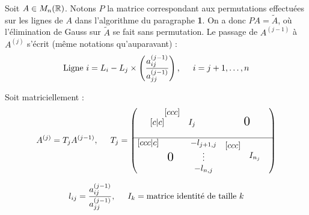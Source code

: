 Soit $A \in M_n(\mathbb{R})$. Notons $P$ la matrice correspondant aux permutations effectuées sur les lignes de $A$ dans l'algorithme du paragraphe \textbf{1}.
On a donc $PA = \tilde{A}$, où l'élimination de Gauss sur $\tilde{A}$ se fait sans permutation. Le passage de $A^{(j-1)}$ à $A^{(j)}$ s'écrit (même notations qu'auparavant) : 
\[
    \text{Ligne $i$} = L_i - L_j \times \left( \frac{a^{(j-1)}_{ij}}{a^{(j-1)}_{jj}} \right), \hspace{0.5cm} i = j+1, \dots , n
\]

Soit matriciellement :
\[
    A^{(j)} = T_j A^{(j-1)}, \hspace{0.5cm} T_j =
    \begin{pmatrix}[c|c]
        \begin{matrix}[ccc]
        & & \\
        & I_j & \\
        & & \\
        \end{matrix} 
        &
        \begin{matrix}
            \scalebox{1.5}{0}
        \end{matrix}
        \\ \hline
        \begin{matrix}[ccc|c]
            & & & -l_{j+1,j} \\
            & \scalebox{1.5}{0} & & \vdots \\
            & & & -l_{n,j}
        \end{matrix}
        &
        \begin{matrix}[ccc]
        & & \\
        & I_{n_j} & \\
        & & \\
        \end{matrix} 
    \end{pmatrix}
\]

\[
    l_{ij} = \frac{a^{(j-1)}_{ij}}{a^{(j-1)}_{jj}} , \hspace{0.5cm} I_k = \text{matrice identité de taille $k$}
\]

